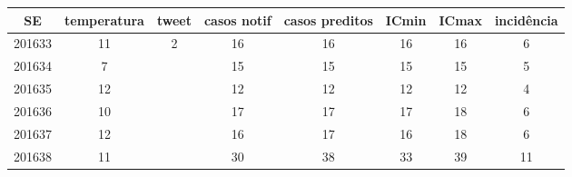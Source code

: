 \begin{tabular}{c|ccccccc}
  \hline
SE & temperatura & tweet & casos notif & casos preditos & ICmin & ICmax & incidência \\ 
  \hline
201633 & 11 & 2 & 16 & 16 & 16 & 16 & 6 \\ 
  201634 & 7 &  & 15 & 15 & 15 & 15 & 5 \\ 
  201635 & 12 &  & 12 & 12 & 12 & 12 & 4 \\ 
  201636 & 10 &  & 17 & 17 & 17 & 18 & 6 \\ 
  201637 & 12 &  & 16 & 17 & 16 & 18 & 6 \\ 
  201638 & 11 &  & 30 & 38 & 33 & 39 & 11 \\ 
   \hline
\end{tabular}
